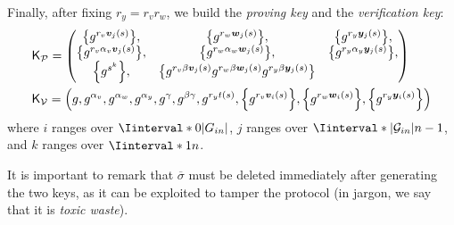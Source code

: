 Finally, after fixing \(r_y = r_{v}r_{w}\), we build the \emph{proving key} and the 
\emph{verification key}:
\begin{align*}
  & \ProverKey = 
  \begin{pmatrix*}
    \Set{g^{r_{v}\call{\bm{v}_j}{s}}}, &
    \Set{g^{r_{w}\call{\bm{w}_j}{s}}}, &
    \Set{g^{r_{y}\call{\bm{y}_j}{s}}}, \\
    \Set{g^{r_{v}\alpha_v\call{\bm{v}_j}{s}}}, &
    \Set{g^{r_{w}\alpha_w\call{\bm{w}_j}{s}}}, &
    \Set{g^{r_{y}\alpha_y\call{\bm{y}_j}{s}}}, \\
    \Set{g^{s^k}}, &
    \Set{g^{r_{v}{\beta}\call{\bm{v}_j}{s}}g^{r_{w}{\beta}\call{\bm{w}_j}{s}}g^{r_{y}{\beta}\call{\bm{y}_j}{s}}}
  \end{pmatrix*} \\
  & \VerifierKey = \Tuple{
    g, 
    g^{\alpha_v}, 
    g^{\alpha_w}, 
    g^{\alpha_y}, 
    g^{\gamma}, 
    g^{\beta\gamma}, 
    g^{r_{y}\call{t}{s}},
    \Set{g^{r_{v}\call{\bm{v}_i}{s}}}, 
    \Set{g^{r_{w}\call{\bm{w}_i}{s}}}, 
    \Set{g^{r_{y}\call{\bm{y}_i}{s}}}
  }
\end{align*}
where \(i\) ranges over \(\Iinterval*{0}{\abs{G_{in}}}\), \(j\) ranges over 
\(\Iinterval*{\abs{\mathcal{G}_{in}}}{n-1}\), and \(k\) ranges over \(\Iinterval*{1}{n}\).

It is important to remark that \(\overbar{\sigma}\) must be deleted immediately after generating 
the two keys, as it can be exploited to tamper the protocol 
(in jargon, we say that it is \emph{toxic waste}).

